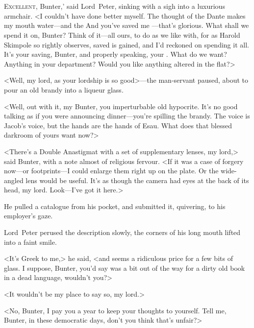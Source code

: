 \chapter[Chapter \thechapter]{}
\lettrine[ante=‘]{E}{xcellent}, Bunter,' said Lord~Peter, sinking with a sigh into a luxurious armchair. <I couldn't have done better myself. The thought of the Dante makes my mouth water—and the  And you've saved me —that's glorious. What shall we spend it on, Bunter? Think of it—all ours, to do as we like with, for as Harold Skimpole so rightly observes,  saved is  gained, and I'd reckoned on spending it all. It's your saving, Bunter, and properly speaking, your . What do we want? Anything in your department? Would you like anything altered in the flat?>

<Well, my lord, as your lordship is so good>—the man-servant paused, about to pour an old brandy into a liqueur glass.

<Well, out with it, my Bunter, you imperturbable old hypocrite. It's no good talking as if you were announcing dinner—you're spilling the brandy. The voice is Jacob's voice, but the hands are the hands of Esau. What does that blessed darkroom of yours want now?>

<There's a Double Anastigmat with a set of supplementary lenses, my lord,> said Bunter, with a note almost of religious fervour. <If it was a case of forgery now—or footprints—I could enlarge them right up on the plate. Or the wide-angled lens would be useful. It's as though the camera had eyes at the back of its head, my lord. Look—I've got it here.>

He pulled a catalogue from his pocket, and submitted it, quivering, to his employer's gaze.

Lord~Peter perused the description slowly, the corners of his long mouth lifted into a faint smile.

<It's Greek to me,> he said, <and  seems a ridiculous price for a few bits of glass. I suppose, Bunter, you'd say  was a bit out of the way for a dirty old book in a dead language, wouldn't you?>

<It wouldn't be my place to say so, my lord.>

<No, Bunter, I pay you  a year to keep your thoughts to yourself. Tell me, Bunter, in these democratic days, don't you think that's unfair?>

